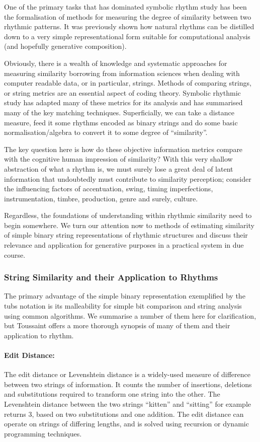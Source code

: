One of the primary tasks that has dominated symbolic rhythm study has been the formalisation of methods for measuring the degree of similarity between two rhythmic patterns. It was previously shown how natural rhythms can be distilled down to a very simple representational form suitable for computational analysis (and hopefully generative composition).

Obviously, there is a wealth of knowledge and systematic approaches for measuring similarity borrowing from information sciences when dealing with computer readable data, or in particular, strings. Methods of comparing strings, or string metrics are an essential aspect of coding theory. Symbolic rhythmic study has adapted many of these metrics for its analysis and \cite{Toussaint2004} has summarised many of the key matching techniques. Superficially, we can take a distance measure, feed it some rhythms encoded as binary strings and do some basic normalisation/algebra to convert it to some degree of “similarity”.

The key question here is how do these objective information metrics compare with the cognitive human impression of similarity? With this very shallow abstraction of what a rhythm is, we must surely lose a great deal of latent information that undoubtedly must contribute to similarity perception; consider the influencing factors of accentuation, swing, timing imperfections, instrumentation, timbre, production, genre and surely, culture. 

Regardless, the foundations of understanding within rhythmic similarity need to begin somewhere. We turn our attention now to methods of estimating similarity of simple binary string representations of rhythmic structures and discuss their relevance and application for generative purposes in a practical system in due course.

\subsubsection{String Similarity and their Application to Rhythms}

The primary advantage of the simple binary representation exemplified by the \acrshort{tubs} notation is its malleability for simple bit comparison and string analysis using common algorithms. We summarise a number of them here for clarification, but Toussaint  offers a more thorough synopsis of many of them and their application to rhythm.

\paragraph{Edit Distance:} The edit distance or Levenshtein distance is a widely-used measure of difference between two strings of information. It counts the number of insertions, deletions and substitutions required to transform one string into the other. The  Levenshtein distance between the two strings “kitten” and “sitting” for example returns 3, based on two substitutions and one addition. The edit distance can operate on strings of differing lengths, and is solved using recursion or dynamic programming techniques.

